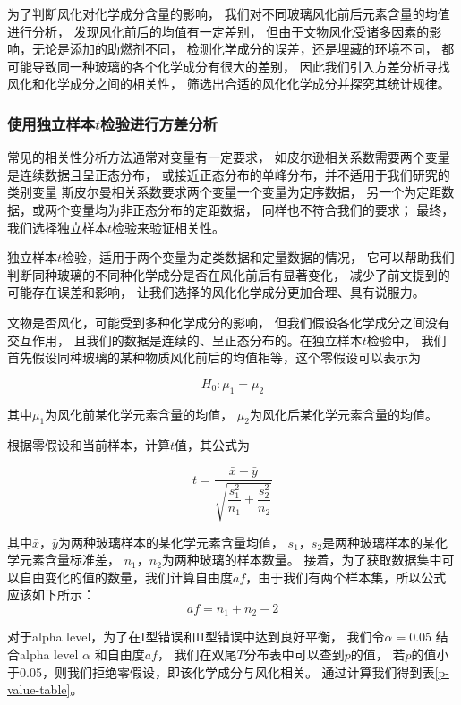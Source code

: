\documentclass[withoutpreface,bwprint]{cumcmthesis} %
\begin{document}
为了判断风化对化学成分含量的影响，
我们对不同玻璃风化前后元素含量的均值进行分析，
发现风化前后的均值有一定差别，
但由于文物风化受诸多因素的影响，无论是添加的助燃剂不同，
检测化学成分的误差，还是埋藏的环境不同，
都可能导致同一种玻璃的各个化学成分有很大的差别，
因此我们引入方差分析寻找风化和化学成分之间的相关性，
筛选出合适的风化化学成分并探究其统计规律。

\subsubsection{使用独立样本$t$检验进行方差分析}
常见的相关性分析方法通常对变量有一定要求，
如皮尔逊相关系数需要两个变量是连续数据且呈正态分布，
或接近正态分布的单峰分布，并不适用于我们研究的类别变量
斯皮尔曼相关系数要求两个变量一个变量为定序数据，
另一个为定距数据，或两个变量均为非正态分布的定距数据，
同样也不符合我们的要求；
最终，我们选择独立样本$t$检验来验证相关性。

独立样本$t$检验，适用于两个变量为定类数据和定量数据的情况，
它可以帮助我们判断同种玻璃的不同种化学成分是否在风化前后有显著变化，
减少了前文提到的可能存在误差和影响，
让我们选择的风化化学成分更加合理、具有说服力。

文物是否风化，可能受到多种化学成分的影响，
但我们假设各化学成分之间没有交互作用，
且我们的数据是连续的、呈正态分布的。在独立样本$t$检验中，
我们首先假设同种玻璃的某种物质风化前后的均值相等，这个零假设可以表示为

\begin{equation}
    H_0: \mu_{1} = \mu_{2}
\end{equation}

其中$\mu_{1}$为风化前某化学元素含量的均值，
$\mu_{2}$为风化后某化学元素含量的均值。

根据零假设和当前样本，计算$t$值，其公式为

\begin{equation}
    t = \dfrac{\bar{x} - \bar{y}}{\sqrt{\dfrac{s^2_1}{n_1} + \dfrac{s^2_2}{n_2}}}
\end{equation}

其中$\bar{x}$，$\bar{y}$为两种玻璃样本的某化学元素含量均值，
$s_1$，$s_2$是两种玻璃样本的某化学元素含量标准差，
$n_1$，$n_2$为两种玻璃的样本数量。
接着，为了获取数据集中可以自由变化的值的数量，我们计算自由度$af$，由于我们有两个样本集，所以公式应该如下所示：
\begin{equation}
    af=n_1 +n_2 - 2
\end{equation}

对于alpha level，为了在I型错误和II型错误中达到良好平衡，
我们令$\alpha=0.05$
结合alpha level $\alpha$ 和自由度$af$，
我们在双尾$T$分布表中可以查到$p$的值，
若$p$的值小于0.05，则我们拒绝零假设，即该化学成分与风化相关。
通过计算我们得到表\ref{p-value-table}。
\end{document}
